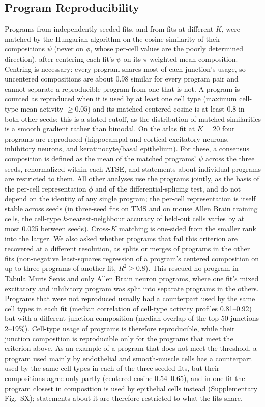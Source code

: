 \subsection*{Program Reproducibility}
\label{sec:reproducibility}
Programs from independently seeded fits, and from fits at different $K$, were matched by the Hungarian algorithm on the cosine similarity of their compositions $\psi$ (never on $\phi$, whose per-cell values are the poorly determined direction), after centering each fit's $\psi$ on its $\pi$-weighted mean composition. Centring is necessary: every program shares most of each junction's usage, so uncentered compositions are about 0.98 similar for every program pair and cannot separate a reproducible program from one that is not. A program is counted as reproduced when it is used by at least one cell type (maximum cell-type mean activity $\geq 0.05$) and its matched centered cosine is at least 0.8 in both other seeds; this is a stated cutoff, as the distribution of matched similarities is a smooth gradient rather than bimodal. On the atlas fit at $K = 20$ four programs are reproduced (hippocampal and cortical excitatory neurons, inhibitory neurons, and keratinocyte/basal epithelium). For these, a consensus composition is defined as the mean of the matched programs' $\psi$ across the three seeds, renormalized within each ATSE, and statements about individual programs are restricted to them. All other analyses use the programs jointly, as the basis of the per-cell representation $\phi$ and of the differential-splicing test, and do not depend on the identity of any single program; the per-cell representation is itself stable across seeds (in three-seed fits on TMS and on mouse Allen Brain training cells, the cell-type $k$-nearest-neighbour accuracy of held-out cells varies by at most 0.025 between seeds). Cross-$K$ matching is one-sided from the smaller rank into the larger. We also asked whether programs that fail this criterion are recovered at a different resolution, as splits or merges of programs in the other fits (non-negative least-squares regression of a program's centered composition on up to three programs of another fit, $R^2 \geq 0.8$). This rescued no program in Tabula Muris Senis and only Allen Brain neuron programs, where one fit's mixed excitatory and inhibitory program was split into separate programs in the others. Programs that were not reproduced usually had a counterpart used by the same cell types in each fit (median correlation of cell-type activity profiles 0.81--0.92) but with a different junction composition (median overlap of the top 50 junctions 2--19\%). Cell-type usage of programs is therefore reproducible, while their junction composition is reproducible only for the programs that meet the criterion above. As an example of a program that does not meet the threshold, a program used mainly by endothelial and smooth-muscle cells has a counterpart used by the same cell types in each of the three seeded fits, but their compositions agree only partly (centered cosine 0.54--0.65), and in one fit the program closest in composition is used by epithelial cells instead (Supplementary Fig.~SX); statements about it are therefore restricted to what the fits share.

